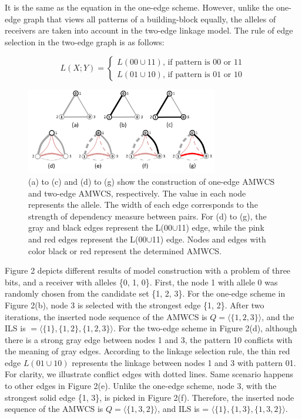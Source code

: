 \documentclass{sig-alternate-05-2015}
\begin{document}
 It is the same as the equation in the  one-edge scheme. However, unlike the one-edge graph that views all patterns of a building-block equally, the alleles of receivers are taken into account in the two-edge linkage model. The rule of edge selection in the two-edge graph is as follows:

\begin{equation}
L(X;Y) = 
   \begin{cases}
    L(00\cup11) \text{, if pattern is 00 or 11} \\
    L(01\cup10) \text{, if pattern is 01 or 10} 
	\end{cases}
\end{equation}



\begin{figure}
\centering
\includegraphics[width=3.3in]{AMWCS}
\caption{(a) to (c) and (d) to (g) show the construction of  one-edge AMWCS and two-edge AMWCS, respectively. The value in each node represents the allele. The width of each edge corresponds to the strength of dependency measure between pairs. For (d) to (g), the gray and black edges represent the L(00$\cup$11) edge, while the pink and red edges represent the L(00$\cup$11) edge. Nodes and edges with color black or red represent the determined AMWCS.}
\end{figure}


Figure 2 depicts different results of model construction with  a problem of three bits, and a receiver with alleles \{0, 1, 0\}. First, the node 1 with allele 0 was randomly chosen from the candidate set \{1, 2, 3\}. For the one-edge scheme in Figure 2(b), node 3 is selected with the strongest edge \{1, 2\}. After two iterations, the inserted node sequence of the AMWCS  is $Q = \langle\{1, 2, 3\}\rangle$, and the ILS is  $=\langle\{1\}, \{1, 2\}, \{1, 2, 3\}\rangle$. For the two-edge scheme in Figure 2(d), although there is a strong gray edge between nodes 1 and 3,  the pattern 10 conflicts with the meaning of gray edges.  According to the linkage selection rule, the thin red edge $L(01\cup10)$ represents the linkage between nodes 1 and 3 with pattern 01. For clarity, we illustrate conflict edges with dotted lines. Same scenario happens to other edges in Figure 2(e). Unlike the one-edge scheme, node 3, with the strongest solid edge \{1, 3\}, is picked in Figure 2(f). Therefore, the inserted node sequence of the AMWCS is $Q = \langle\{1, 3, 2\}\rangle$,  and  ILS is  = $\langle\{1\}, \{1, 3\}, \{1, 3, 2\}\rangle$.
\end{document}
